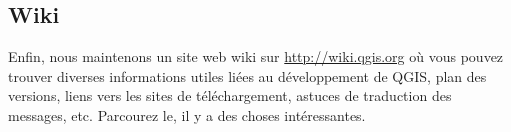 \subsection{Wiki}
Enfin, nous maintenons un site web wiki sur \url{http://wiki.qgis.org} où vous
pouvez trouver diverses informations utiles liées au développement de QGIS, plan
des versions, liens vers les sites de téléchargement, astuces de
traduction des messages, etc. Parcourez le, il y a des choses intéressantes.
